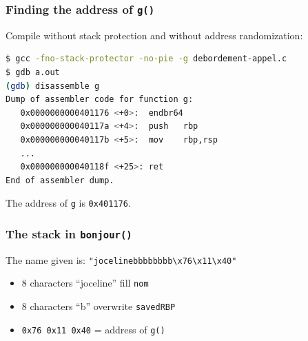 \documentclass{beamer}
\begin{document}
\begin{frame}[fragile]
\frametitle{Finding the address of \texttt{g()}}

Compile without stack protection and without address randomization:

\begin{lstlisting}[language=bash]
$ gcc -fno-stack-protector -no-pie -g debordement-appel.c
$ gdb a.out
(gdb) disassemble g
Dump of assembler code for function g:
   0x0000000000401176 <+0>:  endbr64
   0x000000000040117a <+4>:  push   rbp
   0x000000000040117b <+5>:  mov    rbp,rsp
   ...
   0x000000000040118f <+25>: ret
End of assembler dump.
\end{lstlisting}

The address of \texttt{g} is \texttt{0x401176}.

\end{frame}


\begin{frame}[fragile]
\frametitle{The stack in \texttt{bonjour()}}

\begin{center}
\end{center}

The name given is: \texttt{"jocelinebbbbbbbb\textbackslash x76\textbackslash x11\textbackslash x40"}
\begin{itemize}
\item 8 characters ``joceline'' fill \texttt{nom}
\item 8 characters ``b'' overwrite \texttt{savedRBP}
\item \texttt{0x76 0x11 0x40} = address of \texttt{g()}
\end{itemize}

\end{frame}
\end{document}
